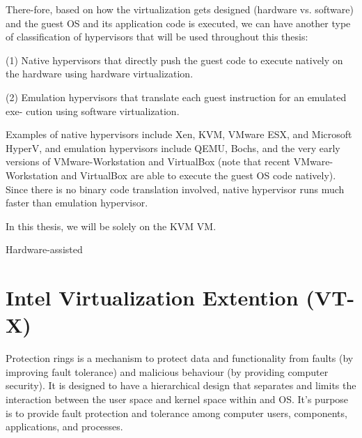 \documentclass{report}
\begin{document}
\begin{spacing}{1.5}
{There-fore, based on how the virtualization gets designed (hardware vs. software) and the guest OS and its 
application code is executed, we can have another type of classification of hypervisors that will be used 
throughout this thesis:
\newline
}

{\large
(1) Native hypervisors that directly push the guest code to execute natively on the
hardware using hardware virtualization.
\newline
}


{\large
(2) Emulation hypervisors that translate each guest instruction for an emulated exe-
cution using software virtualization.
\newline
}

{\large
Examples of native hypervisors include Xen, KVM, VMware ESX, and Microsoft HyperV, and emulation hypervisors include QEMU, Bochs, and the very early versions of
VMware-Workstation and VirtualBox (note that recent VMware-Workstation and VirtualBox are able to execute the guest OS code natively). Since there is no binary code
translation involved, native hypervisor runs much faster than emulation hypervisor.

In this thesis, we will be solely on the KVM VM.








Hardware-assisted




}













\section{Intel Virtualization Extention (VT-X)}

{\large
Protection rings is a mechanism to protect data and functionality from faults (by improving fault tolerance) and malicious behaviour (by providing computer security). It is designed to have a hierarchical design that separates and limits the interaction between the user space and kernel space within and OS. It's purpose is to provide fault protection and tolerance among computer users, components, applications, and processes.
\newline
}


\end{spacing}
\end{document}
